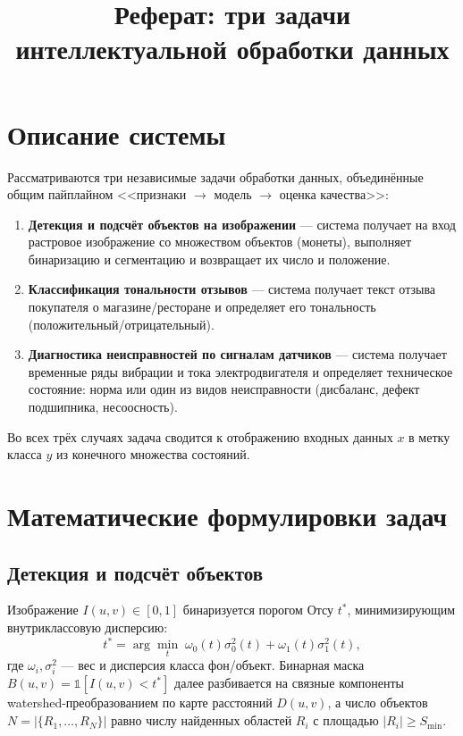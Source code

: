 \documentclass[12pt]{article}
\title{Реферат: три задачи интеллектуальной обработки данных}
\author{}
\date{}
\begin{document}
\maketitle

\section{Описание системы}

Рассматриваются три независимые задачи обработки данных, объединённые общим
пайплайном <<признаки $\to$ модель $\to$ оценка качества>>:

\begin{enumerate}
  \item \textbf{Детекция и подсчёт объектов на изображении} — система получает
        на вход растровое изображение со множеством объектов (монеты),
        выполняет бинаризацию и сегментацию и возвращает их число и положение.
  \item \textbf{Классификация тональности отзывов} — система получает текст
        отзыва покупателя о магазине/ресторане и определяет его тональность
        (положительный/отрицательный).
  \item \textbf{Диагностика неисправностей по сигналам датчиков} — система
        получает временные ряды вибрации и тока электродвигателя и определяет
        техническое состояние: норма или один из видов неисправности
        (дисбаланс, дефект подшипника, несоосность).
\end{enumerate}

Во всех трёх случаях задача сводится к отображению входных данных $x$ в метку
класса $y$ из конечного множества состояний.

\section{Математические формулировки задач}

\subsection{Детекция и подсчёт объектов}

Изображение $I(u,v) \in [0,1]$ бинаризуется порогом Отсу $t^*$, минимизирующим
внутриклассовую дисперсию:
\begin{equation}
  t^* = \arg\min_t \; \omega_0(t)\sigma_0^2(t) + \omega_1(t)\sigma_1^2(t),
\end{equation}
где $\omega_i, \sigma_i^2$ — вес и дисперсия класса фон/объект. Бинарная маска
$B(u,v) = \mathbb{1}[I(u,v) < t^*]$ далее разбивается на связные компоненты
watershed-преобразованием по карте расстояний $D(u,v)$, а число объектов
$N = |\{R_1,\dots,R_N\}|$ равно числу найденных областей $R_i$ с площадью
$|R_i| \ge S_{\min}$.
\end{document}

